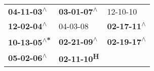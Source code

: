 \begin{supertabular}{lll}
  \textbf{04-11-03\textsuperscript{$\wedge$}} &  \textbf{03-01-07\textsuperscript{$\wedge$}} &                   12-10-10\textsuperscript{} \\
  \textbf{12-02-04\textsuperscript{$\wedge$}} &                   04-03-08\textsuperscript{} &  \textbf{02-17-11\textsuperscript{$\wedge$}} \\
 \textbf{10-13-05\textsuperscript{$\wedge$*}} &  \textbf{02-21-09\textsuperscript{$\wedge$}} &  \textbf{02-19-17\textsuperscript{$\wedge$}} \\
  \textbf{05-02-06\textsuperscript{$\wedge$}} &         \textbf{02-11-10\textsuperscript{H}} &                                              \\
\end{supertabular}
